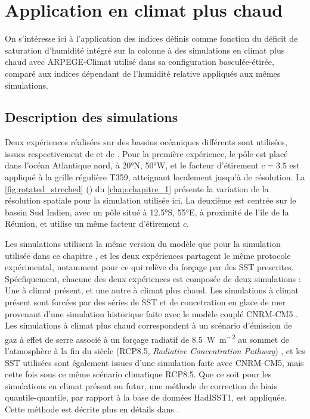 \documentclass[../main.tex]{subfiles}
\begin{document}
\section{Application en climat plus chaud}

On s'intéresse ici à l'application des indices définis comme fonction du déficit de saturation d'humidité intégré sur la colonne à des simulations en climat
plus chaud avec ARPEGE-Climat utilisé dans sa configuration basculée-étirée, comparé aux indices dépendant de l'humidité relative appliqués aux mêmes
simulations.

\subsection{Description des simulations}

Deux expériences réalisées sur des bassins océaniques différents sont utilisées, issues respectivement de \textcite{chauvin_future_2020} et de
\textcite{cattiaux_projected_2020}. Pour la première expérience, le pôle est placé dans l'océan Atlantique nord, à \ang{20}N, \ang{50}W, et le facteur
d'étirement $c=\num{3.5}$ est appliqué à la grille régulière T359, atteignant localement jusqu'à  de résolution. La \cref{fig:rotated_streched}
() du \cref{chap:chapitre_1} présente la variation de la résolution spatiale pour la simulation utilisée ici. La deuxième est
centrée sur le bassin Sud Indien, avec un pôle situé à \ang{12.5}S, \ang{55}E, à proximité de l'île de la Réunion, et utilise un même facteur d'étirement $c$. 

Les simulations utilisent la même version du modèle que pour la simulation utilisée dans ce chapitre \parencite{voldoire_evaluation_2019}, et les deux
expériences partagent le même protocole expérimental, notamment pour ce qui relève du forçage par des SST prescrites. Spécfiquement, chacune des deux
expériences est composée de deux simulations : Une à climat présent, et une autre à climat plus chaud. Les simulations à climat présent sont forcées par des
séries de SST et de concetration en glace de mer provenant d'une simulation historique faite avec le modèle couplé CNRM-CM5 \parencite{voldoire_cnrmcm5_2013}.
Les simulations à climat plus chaud correspondent à un scénario d'émission de gaz à effet de serre associé à un forçage radiatif de
\SI{8.5}{\watt\per\meter\squared} au sommet de l'atmosphère à la fin du siècle (RCP8.5, \textit{Radiative Concentration Pathway})
\parencite{christensen_climate_2013}, et les SST utilisées sont également issues d'une simulation faite avec CNRM-CM5, mais cette fois sous ce même scénario
climatique RCP8.5. Que ce soit pour les simulations en climat présent ou futur, une méthode de correction de biais quantile-quantile, par rapport à la base de
données HadISST1, est appliquée. Cette méthode est décrite plus en détails dans \textcite{chauvin_future_2020}.
\end{document}

